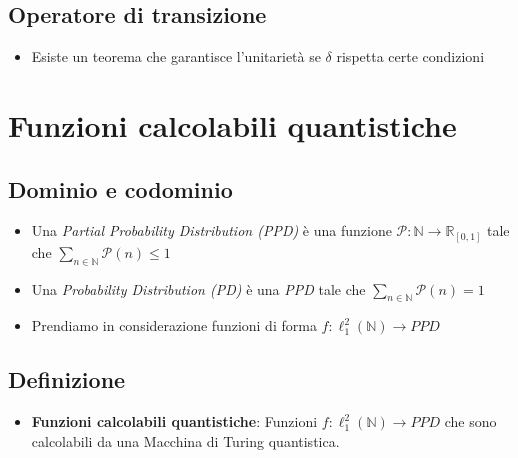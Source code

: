 \documentclass{beamer}
\begin{document}
\subsection{Operatore di transizione}

\begin{frame}{\subsecname}{}
	\begin{itemize}
		\item Esiste un teorema che garantisce l'unitarietà se \(\delta\) rispetta certe condizioni
	\end{itemize}
\end{frame}

\section{Funzioni calcolabili quantistiche}

\subsection{Dominio e codominio}

\begin{frame}{\secname}{\subsecname}
	\begin{itemize}
		\item Una \textit{Partial Probability Distribution (PPD)} è una funzione \( \mathcal{P} : \mathbb{N} \rightarrow \mathbb{R}_{[0,1]} \) tale che \( \sum_{n \in \mathbb{N}} \mathcal{P} \left ( n \right ) \le 1 \)
		\item Una \textit{Probability Distribution (PD)} è una \textit{PPD} tale che \( \sum_{n \in \mathbb{N}} \mathcal{P} \left ( n \right ) = 1 \)
		\item Prendiamo in considerazione funzioni di forma \( f : \ell^{2}_{1} \left ( \mathbb{N} \right ) \rightarrow PPD \)
	\end{itemize}
\end{frame}

\subsection{Definizione}

\begin{frame}{\secname}{\subsecname}
	\begin{itemize}
		\item \textbf{Funzioni calcolabili quantistiche}: Funzioni \( f : \ell^{2}_{1} \left ( \mathbb{N} \right ) \rightarrow PPD \) che sono calcolabili da una Macchina di Turing quantistica.
	\end{itemize}
\end{frame}
\end{document}

